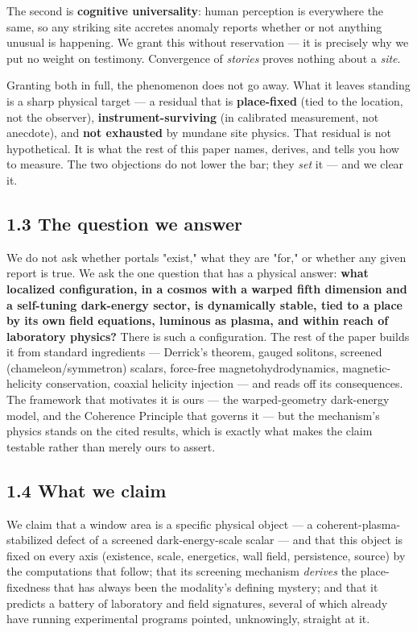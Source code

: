 \documentclass[11pt]{article}
\begin{document}
The second is \textbf{cognitive universality}: human perception is everywhere the same, so any striking site accretes anomaly reports whether or not anything unusual is happening. We grant this without reservation --- it is precisely why we put no weight on testimony. Convergence of \emph{stories} proves nothing about a \emph{site}.

Granting both in full, the phenomenon does not go away. What it leaves standing is a sharp physical target --- a residual that is \textbf{place-fixed} (tied to the location, not the observer), \textbf{instrument-surviving} (in calibrated measurement, not anecdote), and \textbf{not exhausted} by mundane site physics. That residual is not hypothetical. It is what the rest of this paper names, derives, and tells you how to measure. The two objections do not lower the bar; they \emph{set} it --- and we clear it.

\subsection*{1.3 The question we answer}
We do not ask whether portals "exist," what they are "for," or whether any given report is true. We ask the one question that has a physical answer: \textbf{what localized configuration, in a cosmos with a warped fifth dimension and a self-tuning dark-energy sector, is dynamically stable, tied to a place by its own field equations, luminous as plasma, and within reach of laboratory physics?} There is such a configuration. The rest of the paper builds it from standard ingredients --- Derrick's theorem, gauged solitons, screened (chameleon/symmetron) scalars, force-free magnetohydrodynamics, magnetic-helicity conservation, coaxial helicity injection --- and reads off its consequences. The framework that motivates it is ours --- the warped-geometry dark-energy model, and the Coherence Principle that governs it --- but the mechanism's physics stands on the cited results, which is exactly what makes the claim testable rather than merely ours to assert.

\subsection*{1.4 What we claim}
We claim that a window area is a specific physical object --- a coherent-plasma-stabilized defect of a screened dark-energy-scale scalar --- and that this object is fixed on every axis (existence, scale, energetics, wall field, persistence, source) by the computations that follow; that its screening mechanism \emph{derives} the place-fixedness that has always been the modality's defining mystery; and that it predicts a battery of laboratory and field signatures, several of which already have running experimental programs pointed, unknowingly, straight at it.
\end{document}
